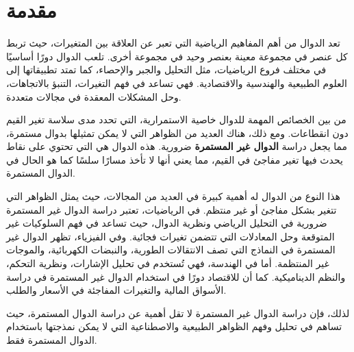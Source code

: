 \chapter*{مقدمة}
	\noindent
	تعد الدوال من أهم المفاهيم الرياضية التي تعبر عن العلاقة بين المتغيرات، حيث تربط كل عنصر في مجموعة معينة بعنصر وحيد في مجموعة أخرى. تلعب الدوال دورًا أساسيًا في مختلف فروع الرياضيات، مثل التحليل والجبر والإحصاء، كما تمتد تطبيقاتها إلى العلوم الطبيعية والهندسية والاقتصادية. فهي تساعد في فهم التغيرات، التنبؤ بالاتجاهات، وحل المشكلات المعقدة في مجالات متعددة.
	
	\noindent
	من بين الخصائص المهمة للدوال خاصية الاستمرارية، التي تحدد مدى سلاسة تغير القيم دون انقطاعات. ومع ذلك، هناك العديد من الظواهر التي لا يمكن تمثيلها بدوال مستمرة، مما يجعل دراسة \textbf{الدوال غير المستمرة} ضرورية. هذه الدوال هي التي تحتوي على نقاط يحدث فيها تغير مفاجئ في القيم، مما يعني أنها لا تأخذ مسارًا سلسًا كما هو الحال في الدوال المستمرة. 
	
	\noindent
	هذا النوع من الدوال له أهمية كبيرة في العديد من المجالات، حيث يمثل الظواهر التي تتغير بشكل مفاجئ أو غير منتظم. في الرياضيات، تعتبر دراسة الدوال غير المستمرة ضرورية في التحليل الرياضي ونظرية الدوال، حيث تساعد في فهم السلوكيات غير المتوقعة وحل المعادلات التي تتضمن تغيرات فجائية. وفي الفيزياء، تظهر الدوال غير المستمرة في النماذج التي تصف الانتقالات الطورية، والنبضات الكهربائية، والموجات غير المنتظمة. أما في الهندسة، فهي تُستخدم في تحليل الإشارات، ونظرية التحكم، والنظم الديناميكية. كما أن للاقتصاد دورًا في استخدام الدوال غير المستمرة في دراسة الأسواق المالية والتغيرات المفاجئة في الأسعار والطلب.
	
	\noindent
	لذلك، فإن دراسة الدوال غير المستمرة لا تقل أهمية عن دراسة الدوال المستمرة، حيث تساهم في تحليل وفهم الظواهر الطبيعية والاصطناعية التي لا يمكن نمذجتها باستخدام الدوال المستمرة فقط.
	
